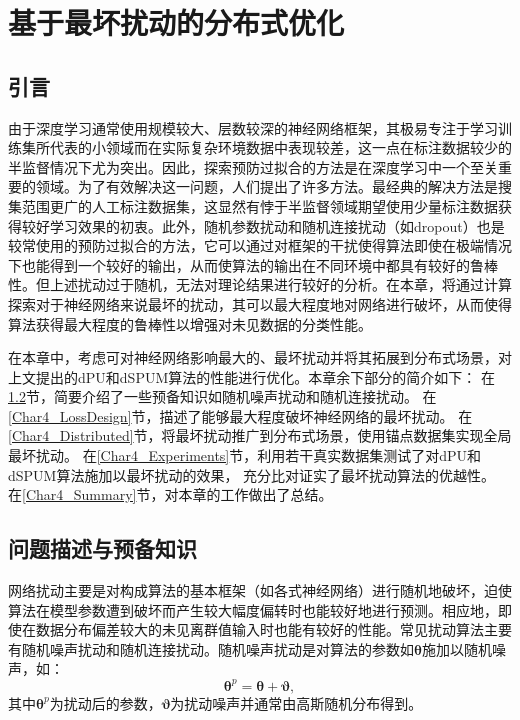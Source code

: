 \chapter{基于最坏扰动的分布式优化}
\section{引言}
由于深度学习通常使用规模较大、层数较深的神经网络框架，其极易专注于学习训练集所代表的小领域而在实际复杂环境数据中表现较差，这一点在标注数据较少的半监督情况下尤为突出。因此，探索预防过拟合的方法是在深度学习中一个至关重要的领域。为了有效解决这一问题，人们提出了许多方法。最经典的解决方法是搜集范围更广的人工标注数据集，这显然有悖于半监督领域期望使用少量标注数据获得较好学习效果的初衷\cite{Shorten_DataAugmentation_2019}。此外，随机参数扰动和随机连接扰动（如dropout\cite{Wei_Dropout_2020}）也是较常使用的预防过拟合的方法，它可以通过对框架的干扰使得算法即使在{极端情况}下也能得到一个较好的输出，从而使算法的输出在不同环境中都具有较好的鲁棒性。但上述扰动过于随机，无法对理论结果进行较好的分析。在本章，将通过计算探索对于神经网络来说最坏的扰动，其可以最大程度地对网络进行破坏，从而使得算法获得最大程度的鲁棒性以增强对未见数据的分类性能\cite{Zhang_WCP_2020}。

在本章中，考虑可对神经网络影响最大的、最坏扰动并将其拓展到分布式场景，对上文提出的dPU和dSPUM算法的性能进行优化。本章余下部分的简介如下：
在\ref{Char4_Preliminaries}节，简要介绍了一些预备知识如随机噪声扰动和随机连接扰动。
在\ref{Char4_LossDesign}节，描述了能够最大程度破坏神经网络的最坏扰动。
在\ref{Char4_Distributed}节，将最坏扰动推广到分布式场景，使用锚点数据集实现全局最坏扰动。
在\ref{Char4_Experiments}节，利用若干真实数据集测试了对dPU和dSPUM算法施加以最坏扰动的效果，
充分比对证实了最坏扰动算法的优越性。
在\ref{Char4_Summary}节，对本章的工作做出了总结。

\section{问题描述与预备知识}\label{Char4_Preliminaries}
网络扰动主要是对构成算法的基本框架（如各式神经网络）进行随机地破坏，迫使算法在模型参数遭到破坏而产生较大幅度偏转时也能较好地进行预测。相应地，即使在{数据分布偏差较大的未见离群值}输入时也能有较好的性能。常见扰动算法主要有随机噪声扰动和随机连接扰动。随机噪声扰动是对算法的参数如$\boldsymbol\theta$施加以随机噪声，如：
\begin{equation}
    \label{P1}
    \boldsymbol\theta^p = \boldsymbol\theta + \boldsymbol\vartheta,
\end{equation}
其中$\boldsymbol\theta^p$为扰动后的参数，$\boldsymbol\vartheta$为扰动噪声并通常由高斯随机分布得到。

